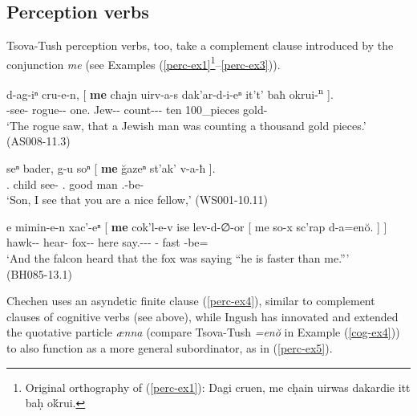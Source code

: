 \subsection{Perception verbs} \label{perception}

Tsova-Tush perception verbs, too, take a complement clause introduced by the conjunction \textit{me} (see Examples (\ref{perc-ex1}\footnote{Original orthography of (\ref{perc-ex1}): Dagi cruen, me cḥain uirwas dakardie itt baḥ o\'{k}rui.}--\ref{perc-ex3})).


	\begin{exe}
		\ex\label{perc-ex1}
		\gll d-ag-iⁿ	cru-e-n,	{{\normalfont[} \textbf{me}}	cħajn	uirv-a-s	dak'ar-d-i-eⁿ	it't'	baħ	{okrui-\textsuperscript{n} {\normalfont]}}.  \\
		{\D}-see-{\Aor}	rogue-{\Obl}-{\Dat}	\textbf{{\Subord}}	one.{\Obl}	Jew-{\Obl}-{\Erg}	count-{\D}-{\Tr}-{\Aor}	ten	100\_pieces	gold-{\Gen}    \\
		\trans `The rogue saw, that a Jewish man was counting a thousand gold pieces.’ \\
		\hfill (AS008-11.3)
	\end{exe}



	\begin{exe}
		\ex\label{perc-ex2}
		\gll seⁿ	bader,	g-u	soⁿ	{{\normalfont[} \textbf{me}}	\u{g}azeⁿ	st'ak'	{v-a-ħ {\normalfont]}}.  \\
		{\Fsg}.{\Gen}	child	see-{\Npst}	{\Fsg}.{\Dat}	\textbf{{\Subord}}	good	man	{\M}.{\Sg}-be-{\Ssg} \\
		\trans `Son, I see that you are a nice fellow,’	
		\hfill (WS001-10.11)
	\end{exe}



	\begin{exe}
		\ex\label{perc-ex3}
		\gll e	mimin-e-n	xac'-eⁿ	{{\normalfont[} \textbf{me}}	cok'l-e-v	ise	lev-d-∅-or  {{\normalfont[} me}	so-x	sc'rap	{d-a=en\u{o}. {\normalfont] ]}}    \\
		{\Prox}	hawk-{\Obl}-{\Dat}	hear-{\Aor}	\textbf{{\Subord}}	fox-{\Obl}-{\Erg}	here    say.{\Ipfv}-{\D}-{\Tr}-{\Imprf}	{\Subord}	{\Fsg}-{\Cont}	fast	{\D}-be={\Quot}	\\
		\trans `And the falcon heard that the fox was saying ``he is faster than me.{''}' \\
		\hfill (BH085-13.1)
	\end{exe}


Chechen uses an asyndetic finite clause (\ref{perc-ex4}), similar to complement clauses of cognitive verbs (see  above), while Ingush has innovated and extended the quotative particle \textit{ænna} (compare Tsova-Tush \textit{=en\u{o}} in Example (\ref{cog-ex4})) to also function as a more general subordinator, as in (\ref{perc-ex5}).


